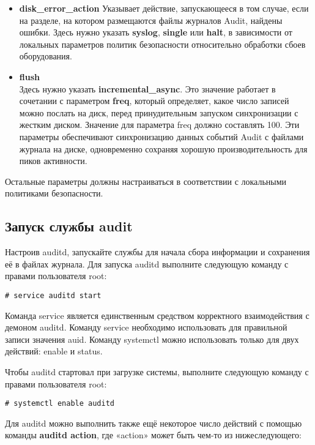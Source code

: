 \documentclass[a4paper,10pt,twoside]{article}
\begin{document}
\begin{itemize}
\item \textbf{disk\_error\_action}
Указывает действие, запускающееся в том случае, если на разделе, на котором размещаются файлы журналов Audit, найдены ошибки. Здесь нужно указать \textbf{syslog}, \textbf{single} или \textbf{halt}, в зависимости от локальных параметров политик безопасности относительно обработки сбоев оборудования.
\item \textbf{flush}\\
Здесь нужно указать \textbf{incremental\_async}. Это значение работает в сочетании с параметром \textbf{freq}, который определяет, какое число записей можно послать на диск, перед принудительным запуском синхронизации с жестким диском. Значение для параметра freq должно составлять 100. Эти параметры обеспечивают синхронизацию данных событий Audit с файлами журнала на диске, одновременно сохраняя хорошую производительность для пиков активности.
\end{itemize}

Остальные параметры должны настраиваться в соответствии с локальными политиками безопасности.

\subsection{Запуск службы audit}
Настроив auditd, запускайте службы для начала сбора информации и сохранения её в файлах журнала. Для запуска auditd выполните следующую команду с правами пользователя root: 
\begin{verbatim}
# service auditd start
\end{verbatim} 

Команда service является единственным средством корректного взаимодействия с демоном auditd. Команду service необходимо использовать для правильной записи значения auid. Команду systemctl можно использовать только для двух действий: enable и status.

Чтобы auditd стартовал при загрузке системы, выполните следующую команду с правами пользователя root: 
\begin{verbatim}
# systemctl enable auditd
\end{verbatim} 

Для auditd можно выполнить также ещё некоторое число действий с помощью команды \textbf{auditd action}, где «action» может быть чем-то из нижеследующего:
\end{document}
